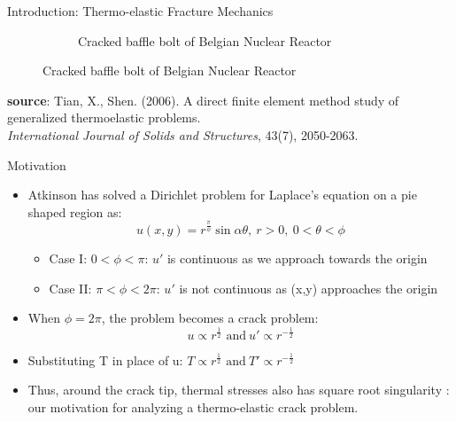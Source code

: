 \documentclass{beamer}
\begin{document}
\begin{frame}[t,fragile]{Introduction: Thermo-elastic Fracture Mechanics}
\begin{itemize}
\begin{figure}[H]
\begin{subfigure}{0.45\textwidth}
 \caption{\tiny{Cracked baffle bolt of Belgian Nuclear Reactor}}
 \end{subfigure}
 \end{figure}
 \end{itemize}
 \vspace{.1cm}
   \tiny
   \hspace{15pt}
    \textbf{source}: Tian, X., Shen. (2006). A direct finite element method study of generalized thermoelastic problems. \\
   \vspace{-7pt}
   \hspace{15pt}
   \emph{International Journal of Solids and Structures}, 43(7), 2050-2063.
\end{frame}
\begin{frame}[t,fragile]{Motivation}
    \vspace{-.3cm}
    \footnotesize
\begin{itemize}
    \item Atkinson has solved a Dirichlet problem for Laplace's equation on a pie shaped region as:\vspace{-.2cm}
        $$u(x,y)= r^{\frac{\pi}{\phi}}\sin\alpha\theta,\  r>0,\ 0<\theta<\phi$$
        \vspace{-.6cm}
        \begin{itemize}
                \footnotesize
    \item Case I: $0<\phi<\pi$:
        $u'$ is continuous as we approach towards the origin 
    \item Case II: $\pi<\phi<2\pi$:
        $u'$ is not continuous as (x,y) approaches the origin 
    \end{itemize}
    \item When $\phi=2\pi$, the problem becomes a crack problem:
    \vspace{-.1cm}$$u \propto r^{\frac{1}{2}}\text{ and} \ u'\propto  r^{-\frac{1}{2}}$$ 
    \vspace{-.4cm}
    \item Substituting T in place of u: 
       $T \propto r^{\frac{1}{2}}\text{ and} \ T'\propto  r^{-\frac{1}{2}}$ 
   \item Thus, around the crack tip, thermal stresses also has square root singularity : our motivation for analyzing a thermo-elastic crack problem. 
\end{itemize}
  \tiny
  \vspace{10pt}

\end{frame}
\end{document}
